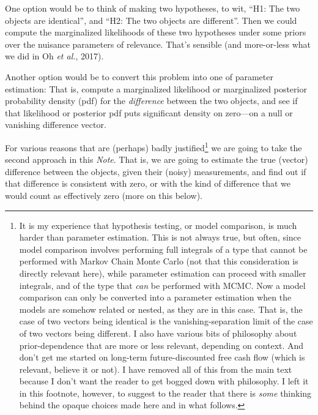 \documentclass[12pt,letterpaper]{article}
\newcommand{\foreign}[1]{\textsl{#1}}
\newcommand{\acronym}[1]{{\small{#1}}}
\newcommand{\documentname}{\textsl{Note}}
\newcommand{\etal}{\foreign{et al.}}
\begin{document}
One option would be to think of making two hypotheses, to wit, ``H1:
The two objects are identical'', and ``H2: The two objects are
different''. Then we could compute the marginalized likelihoods of
these two hypotheses under some priors over the nuisance parameters of
relevance. That's sensible (and more-or-less what we did in Oh \etal, 2017).

Another option would be to convert this problem into one of parameter
estimation: That is, compute a marginalized likelihood or marginalized
posterior probability density (pdf) for the \emph{difference} between
the two objects, and see if that likelihood or posterior pdf puts
significant density on zero---on a null or vanishing difference
vector.

For various reasons that are (perhaps) badly justified\footnote{%
  It is my experience that hypothesis testing, or model comparison, is
  much harder than parameter estimation. This is not always true, but
  often, since model comparison involves performing full integrals of
  a type that cannot be performed with Markov Chain Monte Carlo (not that
  this consideration is directly relevant here),
  while parameter estimation can proceed with smaller integrals, and of
  the type that \emph{can} be performed with \acronym{MCMC}. Now a model
  comparison can only be converted into a parameter estimation when the
  models are somehow related or nested, as they are in this case. That is,
  the case of two vectors being identical is the vanishing-separation limit
  of the case of two vectors being different. I also have various bits of
  philosophy about prior-dependence that are more or less relevant, depending
  on context. And don't get me started on long-term future-discounted free
  cash flow (which is relevant, believe it or not). I have removed all of this
  from the main text because I don't want the reader to
  get bogged down with philosophy. I left it in this footnote, however, to
  suggest to the reader that there is \emph{some} thinking behind the opaque
  choices made here and in what follows.}
we are going
to take the second approach in this \documentname. That is, we are
going to estimate the true (vector) difference between the objects, given their
(noisy) measurements, and find out if that difference is
consistent with zero, or with the kind of difference that we would count
as effectively zero (more on this below).
\end{document}
